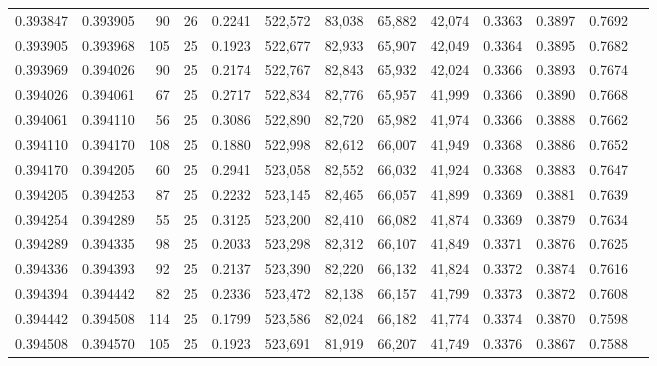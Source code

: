 \begin{tabular}{rrrrrrrrrrrrr}
0.393847 & 0.393905 &    90 &  26 &                                     0.2241 & 522,572 &  83,038 &  65,882 &  42,074 & 0.3363 & 0.3897 & 0.7692 \\
0.393905 & 0.393968 &   105 &  25 &                                     0.1923 & 522,677 &  82,933 &  65,907 &  42,049 & 0.3364 & 0.3895 & 0.7682 \\
0.393969 & 0.394026 &    90 &  25 &                                     0.2174 & 522,767 &  82,843 &  65,932 &  42,024 & 0.3366 & 0.3893 & 0.7674 \\
0.394026 & 0.394061 &    67 &  25 &                                     0.2717 & 522,834 &  82,776 &  65,957 &  41,999 & 0.3366 & 0.3890 & 0.7668 \\
0.394061 & 0.394110 &    56 &  25 &                                     0.3086 & 522,890 &  82,720 &  65,982 &  41,974 & 0.3366 & 0.3888 & 0.7662 \\
0.394110 & 0.394170 &   108 &  25 &                                     0.1880 & 522,998 &  82,612 &  66,007 &  41,949 & 0.3368 & 0.3886 & 0.7652 \\
0.394170 & 0.394205 &    60 &  25 &                                     0.2941 & 523,058 &  82,552 &  66,032 &  41,924 & 0.3368 & 0.3883 & 0.7647 \\
0.394205 & 0.394253 &    87 &  25 &                                     0.2232 & 523,145 &  82,465 &  66,057 &  41,899 & 0.3369 & 0.3881 & 0.7639 \\
0.394254 & 0.394289 &    55 &  25 &                                     0.3125 & 523,200 &  82,410 &  66,082 &  41,874 & 0.3369 & 0.3879 & 0.7634 \\
0.394289 & 0.394335 &    98 &  25 &                                     0.2033 & 523,298 &  82,312 &  66,107 &  41,849 & 0.3371 & 0.3876 & 0.7625 \\
0.394336 & 0.394393 &    92 &  25 &                                     0.2137 & 523,390 &  82,220 &  66,132 &  41,824 & 0.3372 & 0.3874 & 0.7616 \\
0.394394 & 0.394442 &    82 &  25 &                                     0.2336 & 523,472 &  82,138 &  66,157 &  41,799 & 0.3373 & 0.3872 & 0.7608 \\
0.394442 & 0.394508 &   114 &  25 &                                     0.1799 & 523,586 &  82,024 &  66,182 &  41,774 & 0.3374 & 0.3870 & 0.7598 \\
0.394508 & 0.394570 &   105 &  25 &                                     0.1923 & 523,691 &  81,919 &  66,207 &  41,749 & 0.3376 & 0.3867 & 0.7588 \\

\end{tabular}
